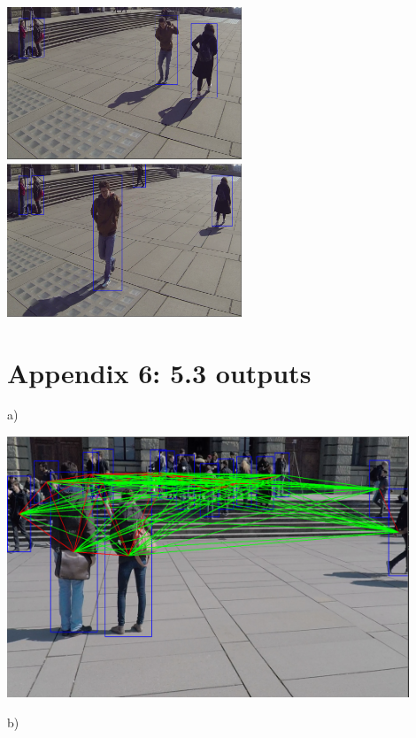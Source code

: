 \documentclass[12pt]{report}
\begin{document}
\includegraphics[width=70mm]{./images/appendix/Video3output3.PNG}
\includegraphics[width=70mm]{./images/appendix/Video3output4.PNG}

\pagebreak
\section*{Appendix 6: 5.3 outputs}
a)


\includegraphics[width=120mm]{./images/appendix/SDNoFilterByPixel.PNG}

b)
\end{document}
